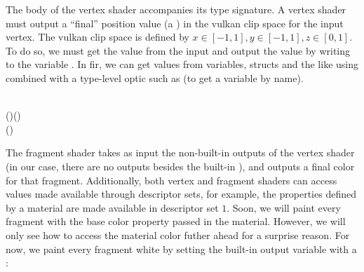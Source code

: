 The body of the vertex shader accompanies its type signature. A vertex shader
must output a ``final'' position value (a ) in the vulkan clip space for
the input vertex. The vulkan clip space is defined by $x\in[-1,1], y\in[-1,1],
z\in[0,1]$.  To do so, we must get the value from the input  and
output the value by writing to the variable . In fir, we can get
values from variables, structs and the like using  combined with a
type-level optic such as  (to get a variable by name).

\begin{hscode}\SaveRestoreHook
{}%
%
%
\>[B]{}\mathrel{=}\;\<[E]%
\\
\>[B]{}\<[3]%
\>[3]{}\mathord{\sim}(\;\;\;)\leftarrow {}(\;){}\<[E]%
\\
\>[B]{}\<[3]%
\>[3]{}\;(\;\;\;\;){}\<[E]%
\ColumnHook
\end{hscode}\resethooks

The fragment shader takes as input the non-built-in outputs of the vertex shader
(in our case, there are no outputs besides the built-in ), and
outputs a final color for that fragment. Additionally, both vertex and fragment
shaders can access values made available through descriptor sets, for example,
the properties defined by a material are made available in descriptor set $1$.
Soon, we will paint every fragment with the base color property passed in the
material. However, we will only see how to access the material color futher
ahead for a surprise reason. For now, we paint every fragment white by setting
the built-in output variable  with a :

\resethooks

